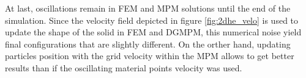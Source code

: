 At last, oscillations remain in FEM and MPM solutions until the end of the simulation. 
Since the velocity field depicted in figure \ref{fig:2dhe_velo} is used to update the shape of the solid in FEM and DGMPM, this numerical noise yield final configurations that are slightly different.
On the orther hand, updating particles position with the grid velocity within the MPM allows to get better results than if the oscillating material points velocity was used.

